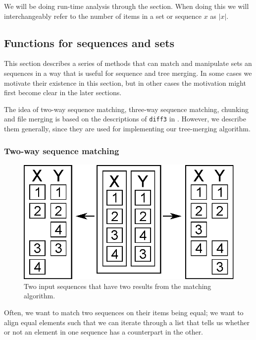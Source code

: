 \documentclass[11pt]{article}
\begin{document}
We will be doing run-time analysis through the section. When doing this we will interchangeably refer to the number of items in a set or sequence $x$ as $|x|$.

\subsection{Functions for sequences and sets}
\label{UtilitiyMethods}
This section describes a series of methods that can match and manipulate sets an sequences in a way that is useful for sequence and tree merging. In some cases we motivate their existence in this section, but in other cases the motivation might first become clear in the later sections.

The idea of two-way sequence matching, three-way sequence matching, chunking and file merging is based on the descriptions of \texttt{diff3} in \citet{Khanna}. However, we describe them generally, since they are used for implementing our tree-merging algorithm.

\subsubsection{Two-way sequence matching}
\begin{figure}
   \centerline{\includegraphics[scale=0.4]{drawings/eps/mincostsequencematchingambigious.eps}}
   \caption{Two input sequences that have two results from the matching algorithm.}
   \label{TwoWayMatchingAmbigiouty}
\end{figure}

Often, we want to match two sequences on their items being equal; we want to align equal elements such that we can iterate through a list that tells us whether or not an element in one sequence has a counterpart in the other.
\end{document}
